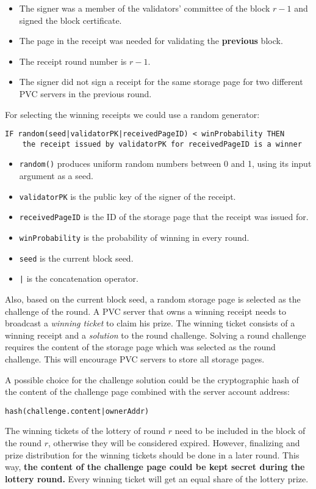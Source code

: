 \begin{itemize}
    \item The signer was a member of the validators' committee of the block $r - 1$ and signed the block certificate.
    \item The page in the receipt was needed for validating the \textbf{previous} block.
    \item The receipt round number is $r - 1$.
    \item The signer did not sign a receipt for the same storage page for two different PVC servers in
    the previous round.
\end{itemize}
For selecting the winning receipts we could use a random generator:
\begin{verbatim}
IF random(seed|validatorPK|receivedPageID) < winProbability THEN
    the receipt issued by validatorPK for receivedPageID is a winner
\end{verbatim}
\begin{itemize}
    \item \texttt{random()} produces uniform random numbers between 0 and 1, using its input argument as a seed.
    \item \texttt{validatorPK} is the public key of the signer of the receipt.
    \item \texttt{receivedPageID} is the ID of the storage page that the receipt was issued for.
    \item \texttt{winProbability} is the probability of winning in every round.
    \item \texttt{seed} is the current block seed.
    \item \texttt{|} is the concatenation operator.
\end{itemize}

Also, based on the current block seed, a random storage page is
selected as the challenge of the round. A PVC server that owns a winning receipt needs to broadcast a \emph{winning
ticket} to claim his prize. The winning ticket consists of a winning receipt and a \emph{solution} to the round
challenge. Solving a round challenge requires the content of the storage page which was selected as the round
challenge. This will encourage PVC servers to store all storage pages.

A possible choice for the challenge solution could be the cryptographic hash of the content of the challenge
page combined with the server account address:

\texttt{hash(challenge.content|ownerAddr)}

The winning tickets of the lottery of round $r$ need to be included in the block of the round $r$,
otherwise they will be considered expired. However, finalizing and prize distribution for the winning tickets
should be done in a later round. This way, \textbf{the content of the challenge page could be
kept secret during the lottery round.} Every winning ticket will get an equal share of the lottery prize.
